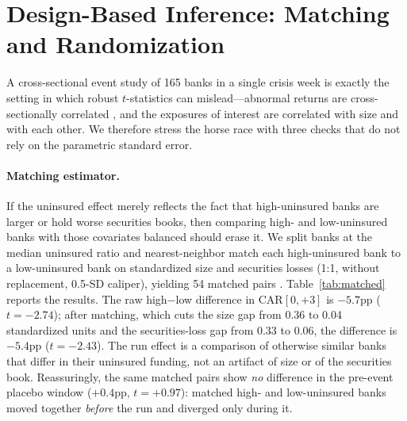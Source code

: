\documentclass[12pt]{article}
\begin{document}
\section{Design-Based Inference: Matching and Randomization}\label{sec:design}
A cross-sectional event study of 165 banks in a single crisis week is exactly the setting in
which robust $t$-statistics can mislead---abnormal returns are cross-sectionally correlated
\citep{kolari2010}, and the exposures of interest are correlated with size and with each
other. We therefore stress the horse race with three checks that do not rely on the
parametric standard error.

\paragraph{Matching estimator.} If the uninsured effect merely reflects the fact that
high-uninsured banks are larger or hold worse securities books, then comparing high- and
low-uninsured banks with those covariates balanced should erase it. We split banks at the
median uninsured ratio and nearest-neighbor match each high-uninsured bank to a low-uninsured
bank on standardized size and securities losses (1:1, without replacement, 0.5-SD caliper),
yielding 54 matched pairs \citep{imbens2004}. Table~\ref{tab:matched} reports the results.
The raw high$-$low difference in CAR$[0,+3]$ is $-5.7$pp ($t=-2.74$); after matching, which
cuts the size gap from 0.36 to 0.04 standardized units and the securities-loss gap from 0.33
to 0.06, the difference is $-5.4$pp ($t=-2.43$). The run effect is a comparison of otherwise
similar banks that differ in their uninsured funding, not an artifact of size or of the
securities book. Reassuringly, the same matched pairs show \emph{no} difference in the
pre-event placebo window ($+0.4$pp, $t=+0.97$): matched high- and low-uninsured banks moved
together \emph{before} the run and diverged only during it.
\end{document}
